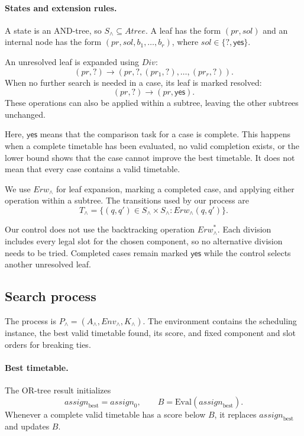 \paragraph{States and extension rules.}
A state is an AND-tree, so
$S_{\land}\subseteq\mathit{Atree}$.
A leaf has the form $(pr,sol)$ and an internal node
has the form $(pr,sol,b_1,\ldots,b_r)$, where
$sol\in\{?,\mathsf{yes}\}$.

An unresolved leaf is expanded using $\mathit{Div}$:
\[
(pr,?)
\longrightarrow
(pr,?,(pr_1,?),\ldots,(pr_r,?)).
\]
When no further search is needed in a case, its leaf is marked resolved:
\[
(pr,?)\longrightarrow(pr,\mathsf{yes}).
\]
These operations can also be applied within a subtree,
leaving the other subtrees unchanged.

Here, $\mathsf{yes}$ means that the comparison task for a
case is complete. This happens when a complete timetable has
been evaluated, no valid completion exists, or the lower bound
shows that the case cannot improve the best timetable.
It does not mean that every case contains a valid timetable.

We use $\mathit{Erw}_{\land}$ for leaf expansion, marking a
completed case, and applying either operation within a subtree.
The transitions used by our process are
\[
T_{\land}
=
\{(q,q')\in S_{\land}\times S_{\land}:
  \mathit{Erw}_{\land}(q,q')\}.
\]

Our control does not use the backtracking operation
$\mathit{Erw}_{\land}^{*}$. Each division includes every
legal slot for the chosen component, so no alternative
division needs to be tried. Completed cases remain marked
$\mathsf{yes}$ while the control selects another unresolved
leaf.

\subsection{Search process}
\label{sec:and-process}

The process is
$P_{\land}=(A_{\land},\mathit{Env}_{\land},K_{\land})$.
The environment contains the scheduling instance,
the best valid timetable found, its score, and fixed
component and slot orders for breaking ties.

\paragraph{Best timetable.}
The OR-tree result initializes
\[
\mathit{assign}_{\mathrm{best}}=\mathit{assign}_0,
\qquad
B=\mathrm{Eval}(\mathit{assign}_{\mathrm{best}}).
\]
Whenever a complete valid timetable has a score below
$B$, it replaces $\mathit{assign}_{\mathrm{best}}$
and updates $B$.

